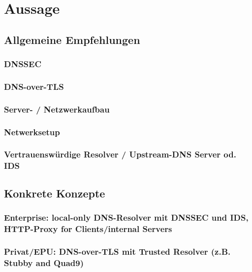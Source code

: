 \chapter{Aussage}
\lipsum

\section{Allgemeine Empfehlungen}

\subsection{DNSSEC}

\subsection{DNS-over-TLS}
\subsection{Server- / Netzwerkaufbau}
\subsection{Netwerksetup}
\subsection{Vertrauenswürdige Resolver / Upstream-DNS Server od. IDS}


\section{Konkrete Konzepte}

\subsection{Enterprise: local-only DNS-Resolver mit DNSSEC und IDS, HTTP-Proxy for Clients/internal Servers}

\subsection{Privat/EPU: DNS-over-TLS  mit Trusted Resolver (z.B. Stubby and Quad9)}

